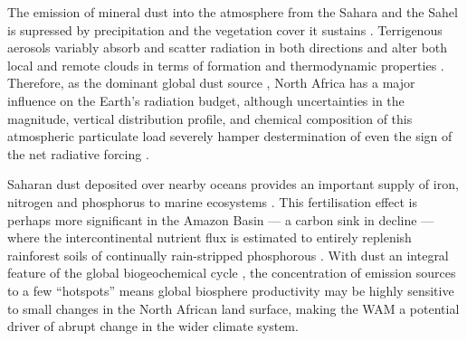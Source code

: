 \documentclass[a4paper]{article}
\begin{document}
The emission of mineral dust into the atmosphere from the Sahara and the Sahel is supressed by precipitation and the vegetation cover it sustains \parencite{brooks2000dust, cowie2013vegetation}.
Terrigenous aerosols variably absorb and scatter radiation in both directions \parencite{andreae1995climatic, tegen1996influence, haywood2000estimates} and alter both local and remote clouds in terms of formation and thermodynamic properties \parencite{rosenfeld2001desert, demott2003african, huang2006possible, karydis2011effect}.  
Therefore, as the dominant global dust source \parencite{tanaka2006numerical}, North Africa has a major influence on the Earth's radiation budget, although uncertainties in the magnitude, vertical distribution profile, and chemical composition of this atmospheric particulate load severely hamper destermination of even the sign of the net radiative forcing \parencite{claquin1998uncertainties, sokolik2001introduction, durant2009sensitivity}.

Saharan dust deposited over nearby oceans provides an important supply of iron, nitrogen and phosphorus to marine ecosystems \parencite{prospero1996saharan, prospero1996atmospheric, guieu2002chemical, mills2004iron, bristow2010fertilizing, okin2011impacts}.
This fertilisation effect is perhaps more significant in the Amazon Basin --- a carbon sink in decline \parencite{brienen2015long} --- where the intercontinental nutrient flux is estimated to entirely replenish rainforest soils of continually rain-stripped phosphorous \parencite{swap1992saharan, bristow2010fertilizing, yu2015fertilizing}.
With dust an integral feature of the global biogeochemical cycle \parencite{ridgwell2002dust, harrison2001role, jickells2005global, mahowald2005atmospheric}, the concentration of emission sources to a few ``hotspots'' \parencite{koren2006bodele, ben2010transport, schepanski2009saharan, knippertz2010central} means global biosphere productivity may be highly sensitive to small changes in the North African land surface, making the WAM a potential driver of abrupt change in the wider climate system.
\end{document}
